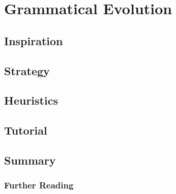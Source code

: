 \section{Grammatical Evolution}

\subsection{Inspiration}


\subsection{Strategy}


\subsection{Heuristics}


\subsection{Tutorial}


\subsection{Summary}


\subsubsection{Further Reading}